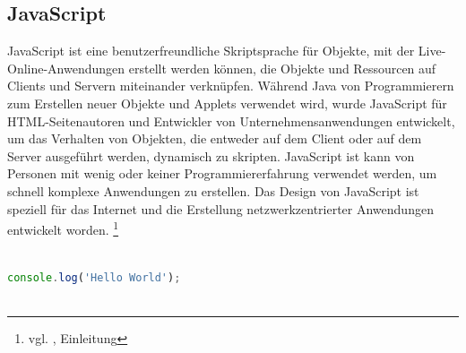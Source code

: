 \subsection{JavaScript}

JavaScript ist eine benutzerfreundliche Skriptsprache für Objekte, mit der Live-Online-Anwendungen erstellt werden können, die Objekte und Ressourcen auf Clients und Servern miteinander verknüpfen. Während Java von Programmierern zum Erstellen neuer Objekte und Applets verwendet wird, wurde JavaScript für HTML-Seitenautoren und Entwickler von Unternehmensanwendungen entwickelt, um das Verhalten von Objekten, die entweder auf dem Client oder auf dem Server ausgeführt werden, dynamisch zu skripten. JavaScript ist kann von Personen mit wenig oder keiner Programmiererfahrung verwendet werden, um schnell komplexe Anwendungen zu erstellen. Das Design von JavaScript ist speziell für das Internet und die Erstellung netzwerkzentrierter Anwendungen entwickelt worden. \footnote{vgl. \cite{javascript}, Einleitung}

\begin{lstlisting}[language=JavaScript, caption={Hello World Programm in JavaScript},captionpos=b]
	
console.log('Hello World');
	
\end{lstlisting}

\newpage


